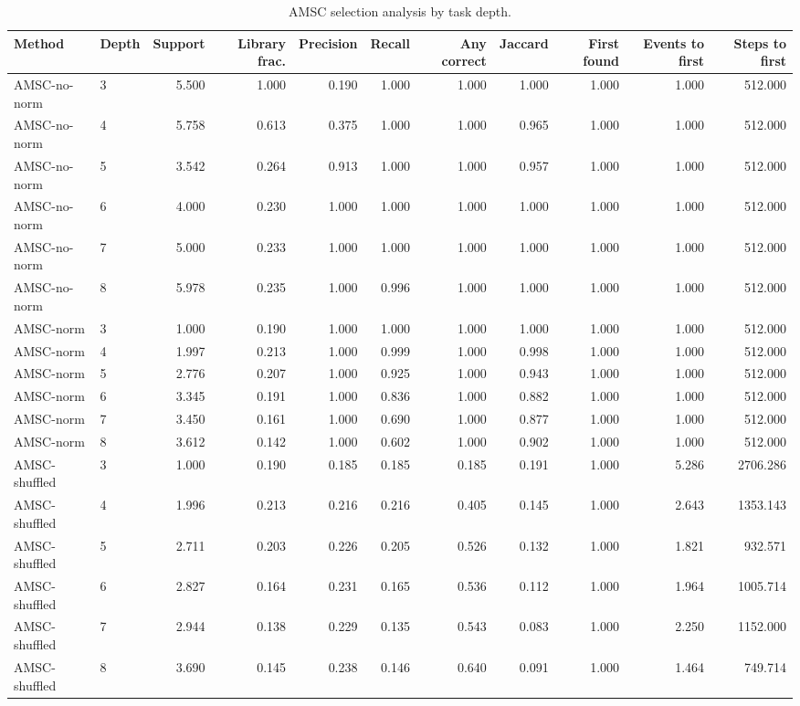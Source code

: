 \begin{table}[ht]
    \caption{AMSC selection analysis by task depth.}
    \label{tbl:amsc_selection_depth}
    \centering
    \scriptsize
    \begin{tabular}{llrrrrrrrrr}
    \toprule
Method & Depth & Support & Library frac. & Precision & Recall & Any correct & Jaccard & First found & Events to first & Steps to first \\
    \midrule
AMSC-no-norm & 3 & 5.500 & 1.000 & 0.190 & 1.000 & 1.000 & 1.000 & 1.000 & 1.000 & 512.000 \\
AMSC-no-norm & 4 & 5.758 & 0.613 & 0.375 & 1.000 & 1.000 & 0.965 & 1.000 & 1.000 & 512.000 \\
AMSC-no-norm & 5 & 3.542 & 0.264 & 0.913 & 1.000 & 1.000 & 0.957 & 1.000 & 1.000 & 512.000 \\
AMSC-no-norm & 6 & 4.000 & 0.230 & 1.000 & 1.000 & 1.000 & 1.000 & 1.000 & 1.000 & 512.000 \\
AMSC-no-norm & 7 & 5.000 & 0.233 & 1.000 & 1.000 & 1.000 & 1.000 & 1.000 & 1.000 & 512.000 \\
AMSC-no-norm & 8 & 5.978 & 0.235 & 1.000 & 0.996 & 1.000 & 1.000 & 1.000 & 1.000 & 512.000 \\
AMSC-norm & 3 & 1.000 & 0.190 & 1.000 & 1.000 & 1.000 & 1.000 & 1.000 & 1.000 & 512.000 \\
AMSC-norm & 4 & 1.997 & 0.213 & 1.000 & 0.999 & 1.000 & 0.998 & 1.000 & 1.000 & 512.000 \\
AMSC-norm & 5 & 2.776 & 0.207 & 1.000 & 0.925 & 1.000 & 0.943 & 1.000 & 1.000 & 512.000 \\
AMSC-norm & 6 & 3.345 & 0.191 & 1.000 & 0.836 & 1.000 & 0.882 & 1.000 & 1.000 & 512.000 \\
AMSC-norm & 7 & 3.450 & 0.161 & 1.000 & 0.690 & 1.000 & 0.877 & 1.000 & 1.000 & 512.000 \\
AMSC-norm & 8 & 3.612 & 0.142 & 1.000 & 0.602 & 1.000 & 0.902 & 1.000 & 1.000 & 512.000 \\
AMSC-shuffled & 3 & 1.000 & 0.190 & 0.185 & 0.185 & 0.185 & 0.191 & 1.000 & 5.286 & 2706.286 \\
AMSC-shuffled & 4 & 1.996 & 0.213 & 0.216 & 0.216 & 0.405 & 0.145 & 1.000 & 2.643 & 1353.143 \\
AMSC-shuffled & 5 & 2.711 & 0.203 & 0.226 & 0.205 & 0.526 & 0.132 & 1.000 & 1.821 & 932.571 \\
AMSC-shuffled & 6 & 2.827 & 0.164 & 0.231 & 0.165 & 0.536 & 0.112 & 1.000 & 1.964 & 1005.714 \\
AMSC-shuffled & 7 & 2.944 & 0.138 & 0.229 & 0.135 & 0.543 & 0.083 & 1.000 & 2.250 & 1152.000 \\
AMSC-shuffled & 8 & 3.690 & 0.145 & 0.238 & 0.146 & 0.640 & 0.091 & 1.000 & 1.464 & 749.714 \\
    \bottomrule
    \end{tabular}
\end{table}

